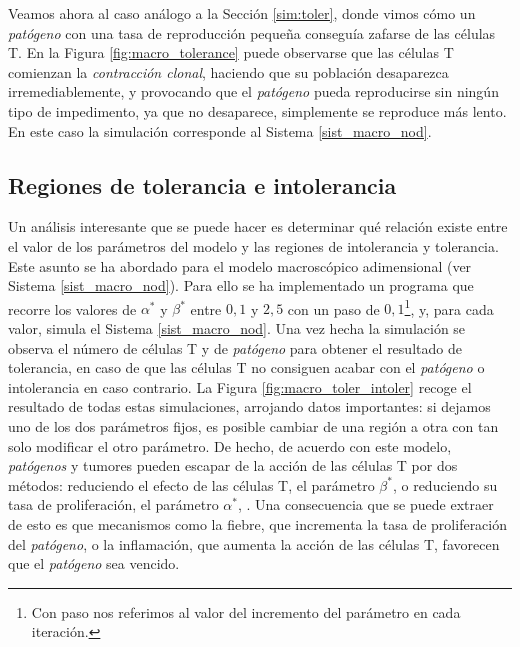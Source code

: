 Veamos ahora al caso análogo a la Sección \ref{sim:toler}, donde vimos cómo un \textit{patógeno} con una tasa de reproducción pequeña conseguía zafarse de las células T. En la Figura \ref{fig:macro_tolerance} puede observarse que las células T comienzan la \textit{contracción clonal}, haciendo que su población desaparezca irremediablemente, y provocando que el \textit{patógeno} pueda reproducirse sin ningún tipo de impedimento, ya que no desaparece, simplemente se reproduce más lento. En este caso la simulación corresponde al Sistema \ref{sist_macro_nod}.




\subsection{Regiones de tolerancia e intolerancia}
\label{sub:reg_tolerIntolerMacro}

Un análisis interesante que se puede hacer es determinar qué relación existe entre el valor de los parámetros del modelo y las regiones de intolerancia y tolerancia. Este asunto se ha abordado para el modelo macroscópico adimensional (ver Sistema \ref{sist_macro_nod}). Para ello se ha implementado un programa que recorre los valores de $\alpha^{*}$ y $\beta^{*}$ entre $0,1$ y $2,5$ con un paso de $0,1$\footnote{Con paso nos referimos al valor del incremento del parámetro en cada iteración.}, y, para cada valor, simula el Sistema \ref{sist_macro_nod}. Una vez hecha la simulación se observa el número de células T y de \textit{patógeno} para obtener el resultado de tolerancia, en caso de que las células T no consiguen acabar con el \textit{patógeno} o intolerancia en caso contrario. La Figura \ref{fig:macro_toler_intoler} recoge el resultado de todas estas simulaciones, arrojando datos importantes: si dejamos uno de los dos parámetros fijos, es posible cambiar de una región a otra con tan solo modificar el otro parámetro. De hecho, de acuerdo con este modelo, \textit{patógenos} y tumores pueden escapar de la acción de las células T por dos métodos: reduciendo el efecto de las células T, el parámetro $\beta^{*}$, o reduciendo su tasa de proliferación, el parámetro $\alpha^{*}$, \citep{arias2016emergent}. Una consecuencia que se puede extraer de esto es que mecanismos como la fiebre, que incrementa la tasa de proliferación del \textit{patógeno}, o la inflamación, que aumenta la acción de las células T, favorecen que el \textit{patógeno} sea vencido. 

